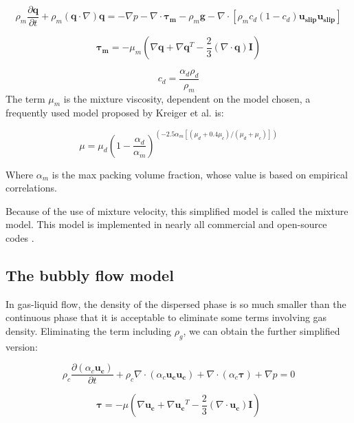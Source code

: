 \begin{equation}
    \rho_m \frac{\partial \mathbf{q}}{\partial t} +\rho_m (\mathbf{q} \cdot \nabla )\mathbf{q} = -\nabla p -\nabla \cdot \mathbf{τ_m} - \rho_m \mathbf{g} - \nabla \cdot [\rho_m c_d (1-c_d)\mathbf{u_{slip}}\mathbf{u_{slip}}]
\end{equation}
   
   
\begin{equation}
    \mathbf{τ_m} = -\mu_m (\nabla \mathbf{q} + \nabla \mathbf{q}^T-\frac{2}{3}(\nabla \cdot \mathbf{q})\mathbf{I})
\end{equation}


\begin{equation}
    c_d = \frac{\alpha_d \rho_d}{\rho_m}
\end{equation}
The term $\mu_m$ is the mixture viscosity, dependent on the model chosen, a frequently used model proposed by Kreiger et al.\cite{Wedin2001} is:

\begin{equation}\label{eq:mixtureviscosity}
    \mu = \mu_d (1-\frac{\alpha_d}{\alpha_m})^{(-2.5\alpha_m[(\mu_d+0.4\mu_c)/(\mu_d+\mu_c)])}
\end{equation}

Where $
\alpha_m$ is the max packing volume fraction, whose value is based on empirical correlations.

Because of the use of mixture velocity, this simplified model is called the mixture model. This model is implemented in nearly all commercial and open-source codes \cite{COMSOL2013, ANSYSFLUENT13UsersGuide2013}.

\subsection{The bubbly flow model}\label{section:bubblyflowmodel}
In gas-liquid flow, the density of the dispersed phase is so much smaller than the continuous phase that it is acceptable to eliminate some terms involving gas density. Eliminating the term including $\rho_g$, we can obtain the further simplified version:

\begin{equation}\label{eq:bubbly1}
         \rho_c \frac{\partial (\alpha_c\mathbf{u_c})}{\partial t}  
        +  \rho_c \nabla \cdot (\alpha _c \mathbf{u_c u_c})  + \nabla \cdot (\alpha_c \mathbf{τ}) + \nabla p
        = 0
\end{equation}

\begin{equation}\label{eq:bubbly2}
    \mathbf{τ} = -\mu (\nabla \mathbf{u_c} + \nabla \mathbf{u_c}^T-\frac{2}{3}(\nabla \cdot \mathbf{u_c})\mathbf{I})
\end{equation}

